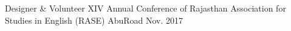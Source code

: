 

\begin{cvhonors}

  \cvhonor
    {Designer \& Volunteer} %
    {XIV Annual Conference of Rajasthan Association for Studies in English (RASE)} %
    {AbuRoad} %
    {Nov. 2017} %

\end{cvhonors}
